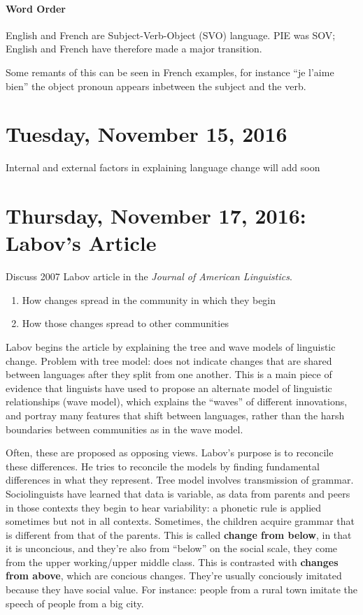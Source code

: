 \documentclass{exam}
\begin{document}
\paragraph{Word Order} English and French are  Subject-Verb-Object (SVO) language. 
PIE was SOV; English and French have therefore made a major transition.

Some remants of this can be seen in French examples, for instance ``je l'aime bien'' the object pronoun appears inbetween the subject and the verb. 



\section*{Tuesday, November 15, 2016}

Internal and external factors in explaining language change
will add soon 

\section*{Thursday, November 17, 2016: Labov's Article}

Discuss 2007 Labov article in the \textit{Journal of American Linguistics}.
\begin{enumerate}
    \item How changes spread in the community in which they begin
    \item How those changes spread to other communities
\end{enumerate}

\noindent Labov begins the article by explaining the tree and wave models of linguistic change. 
Problem with tree model: does not indicate changes that are shared between languages after they split from one another. 
This is a main piece of evidence that linguists have used to propose an alternate model of linguistic relationships (wave model), which explains the ``waves'' of different innovations, and portray many features that shift between languages, rather than the harsh boundaries between communities as in the wave model. 

Often, these are proposed as opposing views. Labov's purpose is to reconcile these differences. 
He tries to reconcile the models by finding fundamental differences in what they represent. 
Tree model involves transmission of grammar. 
Sociolinguists have learned that data is variable, as data from parents and peers in those contexts they begin to hear variability: a phonetic rule is applied sometimes but not in all contexts.
Sometimes, the children acquire grammar that is different from that of the parents.
This is called \textbf{change from below}, in that it is unconcious, and they're also from ``below'' on the social scale, they come from the upper working/upper middle class.
This is contrasted with \textbf{changes from above}, which are concious changes. They're usually conciously imitated because they have social value.
For instance: people from a rural town imitate the speech of people from a big city. 
\end{document}
